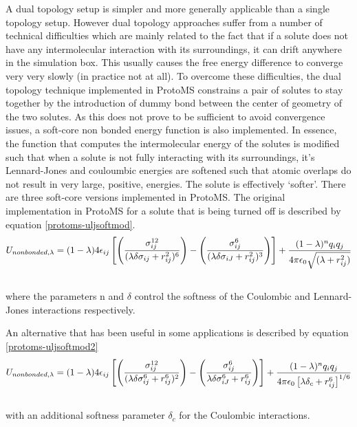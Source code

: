 \documentclass[letterpaper,10pt,english]{manual}
\begin{document}
A dual topology setup is simpler and more generally applicable than a single topology setup. However dual topology approaches suffer from a number of technical difficulties which are mainly related to the fact that if a solute does not have any intermolecular interaction with its surroundings, it can drift anywhere in the simulation box. This usually causes the free energy difference to converge very very slowly (in practice not at all). To overcome these difficulties, the dual topology technique implemented in ProtoMS constrains a pair of solutes to stay together by the introduction of dummy bond between the center of geometry of the two solutes. As this does not prove to be sufficient to avoid convergence issues, a soft-core non bonded energy function is also implemented. In essence, the function that computes the intermolecular energy of the solutes is modified such that when a solute is not fully interacting with its surroundings, it's Lennard-Jones and couloumbic energies are softened such that atomic overlaps do not result in very large, positive, energies. The solute is effectively `softer'. There are three soft-core versions implemented in ProtoMS. The original implementation in ProtoMS for a solute
that is being turned off is described by equation \eqref{protoms-uljsoftmod}.
\hypertarget{equation-uljsoftmod}{}\begin{gather}
\begin{split}U_{non bonded,\lambda}= (1-\lambda) 4{\epsilon}_{ij} \left[ \left( \frac{ \sigma_{ij}^{12} }{ ( \lambda \delta \sigma_{ij} + r_{ij}^{2} )^{6}} \right) - \left( \frac{ \sigma_{ij}^{6} }{ (\lambda \delta \sigma_{iJ}  + r_{ij}^{2})^{3} } \right) \right] +  \frac{(1-\lambda)^{n} q_{i}q_{j}} {4\pi{\epsilon}_{0}\sqrt{(\lambda +  r_{ij}^{2})}}\end{split}\label{protoms-uljsoftmod}\\\begin{split}\end{split}\notag
\end{gather}
where the parameters n and $\delta$ control the softness of the Coulombic and Lennard-Jones interactions respectively.

An alternative that has been useful in some applications is described by equation \eqref{protoms-uljsoftmod2}
\hypertarget{equation-uljsoftmod2}{}\begin{gather}
\begin{split}U_{non bonded,\lambda}= (1-\lambda) 4{\epsilon}_{ij} \left[  \left( \frac{ \sigma_{ij}^{12} }{ ( \lambda \delta \sigma_{ij}^6 + r_{ij}^{6} )^{2}} \right) -  \left( \frac{ \sigma_{ij}^{6} }{ \lambda \delta \sigma_{iJ}^6  + r_{ij}^{6} } \right) \right] +  \frac{(1-\lambda)^{n} q_{i}q_{j}} {4\pi{\epsilon}_{0} \left [ \lambda \delta_c +  r_{ij}^{6} \right ]^{1/6}}\end{split}\label{protoms-uljsoftmod2}\\\begin{split}\end{split}\notag
\end{gather}
with an additional softness parameter $\delta_c$ for the Coulombic interactions.
\end{document}
